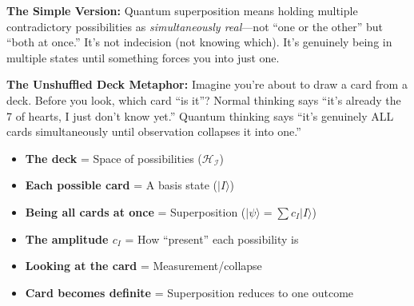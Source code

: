 \documentclass[11pt,twoside]{book}
\newcommand{\Ideas}{\mathcal{I}}
\begin{document}
\begin{tcolorbox}[colback=green!5!white,colframe=green!65!black,title=\textbf{Plain English: What is Quantum Superposition of Ideas?},breakable]

\textbf{The Simple Version:}
Quantum superposition means holding multiple contradictory possibilities as \textit{simultaneously real}---not ``one or the other'' but ``both at once.'' It's not indecision (not knowing which). It's genuinely being in multiple states until something forces you into just one.

\textbf{The Unshuffled Deck Metaphor:}
Imagine you're about to draw a card from a deck. Before you look, which card ``is it''? Normal thinking says ``it's already the 7 of hearts, I just don't know yet.'' Quantum thinking says ``it's genuinely ALL cards simultaneously until observation collapses it into one.''

\begin{itemize}
    \item \textbf{The deck} = Space of possibilities ($\mathcal{H}_{\Ideas}$)
    \item \textbf{Each possible card} = A basis state ($|I\rangle$)
    \item \textbf{Being all cards at once} = Superposition ($|\psi\rangle = \sum c_I|I\rangle$)
    \item \textbf{The amplitude $c_I$} = How ``present'' each possibility is
    \item \textbf{Looking at the card} = Measurement/collapse
    \item \textbf{Card becomes definite} = Superposition reduces to one outcome
\end{itemize}


\end{tcolorbox}
\end{document}
